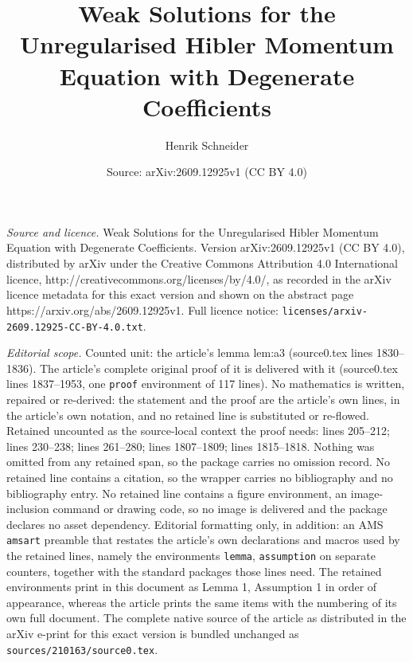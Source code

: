 \documentclass[10pt,a4paper]{amsart}
\title{Weak Solutions for the Unregularised Hibler Momentum Equation with Degenerate Coefficients}
\author{Henrik Schneider}
\date{Source: arXiv:2609.12925v1 (CC BY 4.0)}
\begin{document}
\maketitle

\noindent\emph{Source and licence.} Weak Solutions for the Unregularised Hibler Momentum Equation with Degenerate Coefficients. Version arXiv:2609.12925v1 (CC BY 4.0), distributed by arXiv under the Creative Commons Attribution 4.0 International licence, http://creativecommons.org/licenses/by/4.0/, as recorded in the arXiv licence metadata for this exact version and shown on the abstract page https://arxiv.org/abs/2609.12925v1. Full licence notice: \texttt{licenses/arxiv-2609.12925-CC-BY-4.0.txt}.\par\smallskip

\noindent\textit{Editorial scope.} Counted unit: the article's lemma lem:a3 (source0.tex lines 1830--1836). The article's complete original proof of it is delivered with it (source0.tex lines 1837--1953, one \texttt{proof} environment of 117 lines). No mathematics is written, repaired or re-derived: the statement and the proof are the article's own lines, in the article's own notation, and no retained line is substituted or re-flowed.  Retained uncounted as the source-local context the proof needs: lines 205--212; lines 230--238; lines 261--280; lines 1807--1809; lines 1815--1818.  Nothing was omitted from any retained span, so the package carries no omission record.  No retained line contains a citation, so the wrapper carries no bibliography and no bibliography entry.  No retained line contains a figure environment, an image-inclusion command or drawing code, so no image is delivered and the package declares no asset dependency.  Editorial formatting only, in addition: an AMS \texttt{amsart} preamble that restates the article's own declarations and macros used by the retained lines, namely the environments \texttt{lemma}, \texttt{assumption} on separate counters, together with the standard packages those lines need.  The retained environments print in this document as Lemma 1, Assumption 1 in order of appearance, whereas the article prints the same items with the numbering of its own full document.  The complete native source of the article as distributed in the arXiv e-print for this exact version is bundled unchanged as \texttt{sources/210163/source0.tex}.
\end{document}

